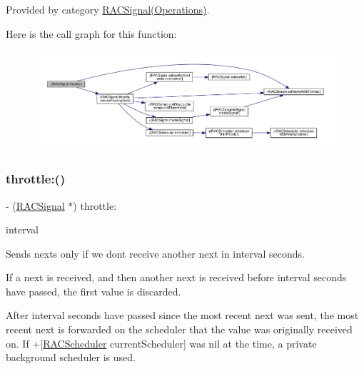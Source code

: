 Provided by category \mbox{\hyperlink{category_r_a_c_signal_07_operations_08_a2542ae804d05ec734d0f4d2fa8c3ac93}{R\+A\+C\+Signal(\+Operations)}}.

Here is the call graph for this function\+:\nopagebreak
\begin{figure}[H]
\begin{center}
\leavevmode
\includegraphics[width=350pt]{interface_r_a_c_signal_a2542ae804d05ec734d0f4d2fa8c3ac93_cgraph}
\end{center}
\end{figure}
\mbox{\label{interface_r_a_c_signal_a2542ae804d05ec734d0f4d2fa8c3ac93}} 
\subsubsection{\texorpdfstring{throttle\+:()}{throttle:()}\hspace{0.1cm}{\footnotesize\ttfamily [3/3]}}
{\footnotesize\ttfamily -\/ (\mbox{\hyperlink{interface_r_a_c_signal}{R\+A\+C\+Signal}} $\ast$) throttle\+: \begin{DoxyParamCaption}\item[{(N\+S\+Time\+Interval)}]{interval }\end{DoxyParamCaption}}

Sends {\ttfamily next}s only if we don\textquotesingle{}t receive another {\ttfamily next} in {\ttfamily interval} seconds.

If a {\ttfamily next} is received, and then another {\ttfamily next} is received before {\ttfamily interval} seconds have passed, the first value is discarded.

After {\ttfamily interval} seconds have passed since the most recent {\ttfamily next} was sent, the most recent {\ttfamily next} is forwarded on the scheduler that the value was originally received on. If +\mbox{[}\mbox{\hyperlink{interface_r_a_c_scheduler}{R\+A\+C\+Scheduler}} current\+Scheduler\mbox{]} was nil at the time, a private background scheduler is used.

